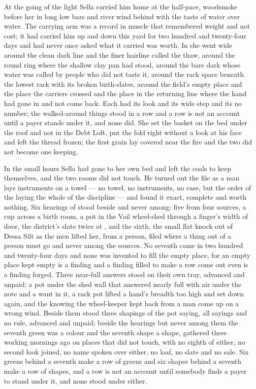 \scenebreak

At the going of the light Sella carried him home at the half-pace, woodsmoke before her in long low bars and river wind behind with the taste of water over water. The carrying arm was a record in muscle that remembered weight and not cost; it had carried him up and down this yard for two hundred and twenty-four days and had never once asked what it carried was worth. In  she went wide around the clean dark line and the finer hairline called the thaw, around the round ring where the shallow clay pan had stood, around the bare dark  whose water was called  by people who did not taste it, around the rack space beneath the lowest rack with its broken birth-slates, around the field's empty place and the place the carriers crossed and the place in the returning line where the hand had gone in and not come back. Each had its look and its wide step and its no number; the walked-around things stood in a row and a row is not an account until a payer stands under it, and none did. She set the basket on the bed under the roof and not in the Debt Loft, put the fold right without a look at his face and left the thread frozen; the first grain lay covered near the fire and the two did not become one keeping.

\scenebreak

In the small hours Sella had gone to her own bed and left the coals to keep themselves, and the two rooms did not touch. He turned out the file as a man lays instruments on a towel --- no towel, no instruments, no case, but the order of the laying the whole of the discipline --- and found it exact, complete and worth nothing. Six hearings of  stood beside and never among: five from four sources, a cup across a birth room, a pot in the Vail wheel-shed through a finger's width of door, the district's slate twice at , and the sixth, the small flat knock out of Dessa Silt as the men lifted her, from a person, filed where a thing out of a person must go and never among the sources. No seventh came in two hundred and twenty-four days and none was invented to fill the empty place, for an empty place kept empty is a finding and a finding filled to make a row come out even is a finding forged. Three near-full answers stood on their own tray, advanced and unpaid: a pot under the shed wall that answered nearly full with air under the note and a want in it, a rack pot lifted a hand's breadth too high and set down again, and the knowing the wheel-keeper kept back from a man come up on a wrong wind. Beside them stood three shapings of the pot saying, all sayings and no rule, advanced and unpaid; beside the hearings but never among them the seventh green was a colour and the seventh shape a shape, gathered three working mornings ago on places that did not touch, with no eighth of either, no second look joined, no name spoken over either, no loaf, no slate and no sale. Six greens behind a seventh make a row of greens and six shapes behind a seventh make a row of shapes, and a row is not an account until somebody finds a payer to stand under it, and none stood under either.


